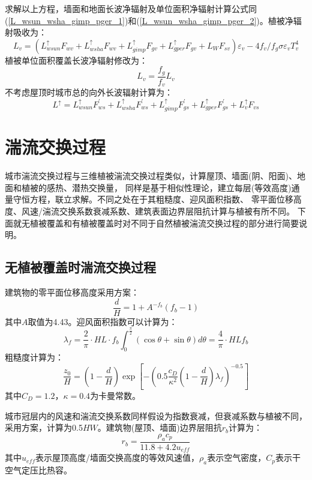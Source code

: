 求解以上方程，墙面和地面长波净辐射及单位面积净辐射计算公式同(\ref{L_wsun_wsha_gimp_pger_1})和(\ref{L_wsun_wsha_gimp_pger_2})。植被净辐射吸收为：
\begin{equation}
L_{v}=\left(L_{wsun}^{\uparrow} F_{w v}+L_{wsha}^{\uparrow} F_{w v}+L_{gimp}^{\uparrow} F_{g v}+L_{gper}^{\uparrow} F_{g v}+L_{W} F_{s v}\right) \varepsilon_{v}-4 f_{v} / f_{g} \sigma \varepsilon_{v} T_{v}^{4}
\end{equation}
植被单位面积覆盖长波净辐射修改为：
\begin{equation}
L_{v}=\frac{f_{g}}{f_{v}} L_{v}
\end{equation}
不考虑屋顶时城市总的向外长波辐射计算为：
\begin{equation}
L^{\uparrow}=L_{wsun}^{\uparrow} F_{ws}^{\prime}+L_{wsha}^{\uparrow} F_{ws}^{\prime}+L_{gimp}^{\uparrow} F_{gs}^{\prime}+L_{gper}^{\uparrow} F_{gs}^{\prime}+L_{v}^{\uparrow} F_{v s}
\end{equation}
\section{湍流交换过程}
城市湍流交换过程与三维植被湍流交换过程类似，计算屋顶、墙面(阴、阳面)、地面和植被的感热、潜热交换量，
同样是基于相似性理论，建立每层(等效高度)通量守恒方程，联立求解。不同之处在于其粗糙度、迎风面积指数、
零平面位移高度、风速/湍流交换系数衰减系数、建筑表面边界层阻抗计算与植被有所不同。
下面就无植被覆盖和有植被覆盖时对不同于自然植被湍流交换过程的部分进行简要说明。
\subsection{无植被覆盖时湍流交换过程}
建筑物的零平面位移高度采用\citet{macdonald1998improved}方案：
\begin{equation}
\frac{d}{H}=1+A^{-f_{b}}\left(f_{b}-1\right)
\end{equation}
其中$A$取值为4.43。迎风面积指数可以计算为：
\begin{equation}
\lambda_{f}=\frac{2}{\pi} \cdot H L \cdot f_{b} \int_{0}^{\frac{\pi}{2}}(\cos \theta+\sin \theta) d \theta=\frac{4}{\pi} \cdot H L f_{b}
\end{equation}
粗糙度计算为：
\begin{equation}
\frac{z_{0}}{H}=\left(1-\frac{d}{H}\right) \exp \left[-\left(0.5 \frac{c_{D}}{\kappa^{2}}\left(1-\frac{d}{H}\right) \lambda_{f}\right)^{-0.5}\right]
\end{equation}
其中$C_D=1.2$，$\kappa=0.4$为卡曼常数。

城市冠层内的风速和湍流交换系数同样假设为指数衰减，但衰减系数与植被不同，
采用\citet{masson2000physically}方案，计算为0.5$HW$。建筑物(屋顶、墙面)边界层阻抗$r_b$计算为\citep{oleson2008urban}：
\begin{equation}
r_{b}=\frac{\rho_{a} c_{p}}{11.8+4.2 u_{e f f}}
\end{equation}
其中$u_{eff}$表示屋顶高度/墙面交换高度的等效风速值，$\rho_a$表示空气密度，$C_p$表示干空气定压比热容。

